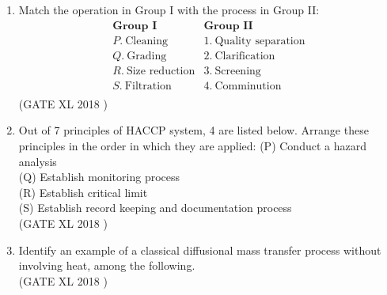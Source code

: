 \documentclass[14pt]{extarticle}
\begin{document}
\begin{flushleft}
\begin{enumerate}
\item Match the operation in Group I with the process in Group II:
\[
\begin{array}{ll}
\textbf{Group I} & \textbf{Group II} \\
P. \ \text{Cleaning} & 1. \ \text{Quality separation} \\
Q. \ \text{Grading} & 2. \ \text{Clarification} \\
R. \ \text{Size reduction} & 3. \ \text{Screening} \\
S. \ \text{Filtration} & 4. \ \text{Comminution} \\
\end{array}
\]
\hfill(GATE XL 2018 )\\

\begin{enumerate}[label=(\Alph*)]
\end{enumerate}

\item Out of 7 principles of HACCP system, 4 are listed below. Arrange these principles in the order in which they are applied:
(P) Conduct a hazard analysis \\
(Q) Establish monitoring process \\
(R) Establish critical limit \\
(S) Establish record keeping and documentation process\\
\hfill(GATE XL 2018 )\\

\begin{enumerate}[label=(\Alph*)]
\end{enumerate}

\item Identify an example of a classical diffusional mass transfer process without involving heat, among the following.\\
\hfill(GATE XL 2018 )\\


\end{enumerate}
\end{flushleft}
\end{document}
